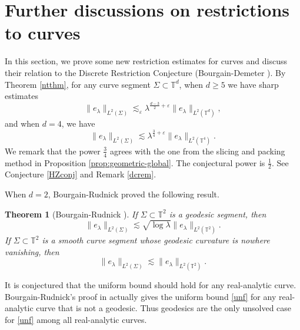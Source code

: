 \documentclass[11pt,reqno]{amsart}
\newtheorem{theorem}{Theorem}[section]
\numberwithin{equation}{section}
\newcommand{\1}{\textbf{1}}
\newcommand{\ls}{\lesssim}
\newcommand{\eps}{\varepsilon}
\newcommand{\la}{\lambda}
\begin{document}
	
	\section{Further discussions on restrictions to curves}\label{sec6}
	In this section, we prove some new restriction estimates for curves and discuss their relation to the Discrete Restriction Conjecture (Bourgain-Demeter \cite[Conjecture 2.6]{BD}). By Theorem \ref{ntthm}, for any curve segment $\Sigma \subset \mathbb{T}^d$, when $d\ge5$ we have sharp estimates 
	\begin{equation}\label{T5}
		\|e_\la\|_{L^2(\Sigma)}\ls_\eps \la^{\frac{d-3}2+\eps}\|e_\la\|_{L^2(\mathbb{T}^d)},
	\end{equation}
	and when $d=4$, we have
	\begin{equation}\label{T4}
		\|e_\la\|_{L^2(\Sigma)}\ls \la^{\frac34+\eps}\|e_\la\|_{L^2(\mathbb{T}^4)}.
	\end{equation}
	We remark that the power $\frac34$ agrees with the one from the slicing and packing method in Proposition \ref{prop:geometric-global}. The conjectural power is $\frac12$. See Conjecture \ref{HZconj} and Remark \ref{dcrem}.
	
	
	When $d=2$, Bourgain-Rudnick proved the following result.
	\begin{theorem}[Bourgain-Rudnick \cite{BR2011,BR2015}]
		If $\Sigma\subset \mathbb{T}^2$ is a geodesic segment, then 
		\begin{equation}
			\|e_\la\|_{L^2(\Sigma)}\ls \sqrt{\log\la}\|e_\la\|_{L^2(\mathbb{T}^2)}.
		\end{equation}
		If $\Sigma\subset \mathbb{T}^2$ is a smooth curve segment whose geodesic curvature is nowhere vanishing, then 
		\begin{equation}\label{unf}
			\|e_\la\|_{L^2(\Sigma)}\ls \|e_\la\|_{L^2(\mathbb{T}^2)}.
		\end{equation}
	\end{theorem}
	It is conjectured that the uniform bound should hold for any real-analytic curve. Bourgain-Rudnick's proof in \cite{BR2011} actually gives the uniform bound \eqref{unf} for any real-analytic curve that is not a geodesic. Thus geodesics are the only unsolved case for \eqref{unf} among all real-analytic curves.
	
\end{document}
